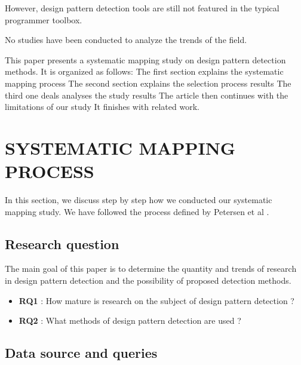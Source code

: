 \documentclass[letterpaper, 10 pt, conference]{ieeeconf}  %
\begin{document}
However, design pattern detection tools are still not featured in the typical
programmer toolbox.

No studies have been conducted to analyze the trends of the field.

This paper presents a systematic mapping study on design pattern detection
methods.
It is organized as follows: 
 The first section explains the systematic mapping process
 The second section explains the selection process results
 The third one deals analyses the study results
 The article then continues with the limitations of our study
 It finishes with related work. 



\section{SYSTEMATIC MAPPING PROCESS}

In this section, we discuss step by step how we conducted our systematic
mapping study.
We have followed the process defined by Petersen et al \cite{c1}. 

\subsection{Research question}

The main goal of this paper is to determine the quantity and trends of research
in design pattern detection and the possibility of proposed detection methods.


\begin{itemize}
	\item \textbf{RQ1} : How mature is research on the subject of design pattern detection ?
	\item \textbf{RQ2} : What methods of design pattern detection are used ?
\end{itemize}


\subsection{Data source and queries}
\end{document}
